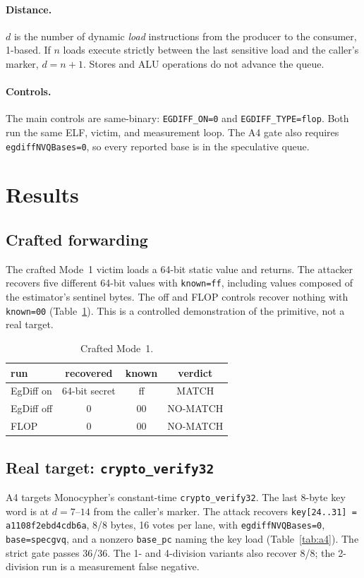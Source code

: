 \documentclass[conference]{IEEEtran}
\newcommand{\code}[1]{\texttt{\small #1}}
\begin{document}
\paragraph{Distance.}
$d$ is the number of dynamic \emph{load} instructions from the producer
to the consumer, 1-based. If $n$ loads execute strictly between the last
sensitive load and the caller's marker, $d=n+1$. Stores and ALU
operations do not advance the queue.

\paragraph{Controls.}
The main controls are same-binary: \code{EGDIFF\_ON=0} and
\code{EGDIFF\_TYPE=flop}. Both run the same ELF, victim, and measurement
loop. The A4 gate also requires \code{egdiffNVQBases=0}, so every
reported base is in the speculative queue.

\section{Results}

\subsection{Crafted forwarding}
The crafted Mode~1 victim loads a 64-bit static value and returns. The
attacker recovers five different 64-bit values with \code{known=ff},
including values composed of the estimator's sentinel bytes. The off and
FLOP controls recover nothing with \code{known=00} (Table~\ref{tab:crafted}).
This is a controlled demonstration of the primitive, not a real target.

\begin{table}[h]
\centering\small
\caption{Crafted Mode~1.}
\label{tab:crafted}
\begin{tabular}{@{}lccc@{}}
\toprule
run & recovered & known & verdict\\
\midrule
EgDiff on & 64-bit secret & ff & MATCH\\
EgDiff off & 0 & 00 & NO-MATCH\\
FLOP & 0 & 00 & NO-MATCH\\
\bottomrule
\end{tabular}
\end{table}

\subsection{Real target: \code{crypto\_verify32}}
A4 targets Monocypher's constant-time \code{crypto\_verify32}. The last
8-byte key word is at $d=7$--$14$ from the caller's marker. The attack
recovers \code{key[24..31] = a1108f2ebd4cdb6a}, 8/8 bytes, 16 votes per
lane, with \code{egdiffNVQBases=0}, \code{base=specgvq}, and a nonzero
\code{base\_pc} naming the key load (Table~\ref{tab:a4}). The strict
gate passes 36/36. The 1- and 4-division variants also recover 8/8; the
2-division run is a measurement false negative.
\end{document}
